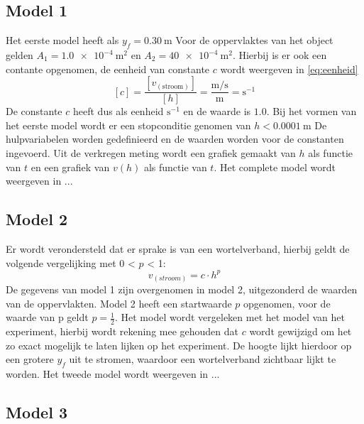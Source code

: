 \documentclass[numbers=endperiod]{scrartcl}
\begin{document}
\subsection{Model 1}
Het eerste model heeft als $y_f=\SI{0.30}{\meter}$ Voor de oppervlaktes van het object gelden $A_1=\SI{1.0e-4}{\meter\squared}$ en $A_2=\SI{40e-4}{\meter\squared}$. Hierbij is er ook een contante opgenomen, de eenheid van constante $c$ wordt weergeven in \ref{eq:eenheid}
\begin{equation}\label{eq:eenheid}
[c] = \frac{[v_{(\text{stroom})}]}{[h]} = \frac{\si{\meter\per\second}}{\si{\meter}} = \si{\second}^{-1}
\end{equation}
De constante $c$ heeft dus als eenheid $\si{\second}^{-1}$ en de waarde is $1.0$.
Bij het vormen van het eerste model wordt er een stopconditie genomen van $h<\SI{0.0001}{\meter}$ De hulpvariabelen worden gedefinieerd en de waarden worden voor de constanten ingevoerd. Uit de verkregen meting wordt een grafiek gemaakt van $h$ als functie van $t$ en een grafiek van $v(h)$ als functie van $t$. Het complete model wordt weergeven in ... 

\newpage
\subsection{Model 2}
Er wordt verondersteld dat er sprake is van een wortelverband, hierbij geldt de volgende vergelijking met 0 < $p$ < 1:
\begin{equation}
    v_{(stroom)} = c \cdot h^p
\end{equation}
De gegevens van model 1 zijn overgenomen in model 2, uitgezonderd de waarden van de oppervlakten. Model 2 heeft een startwaarde $p$ opgenomen, voor de waarde van p geldt $p=\frac{1}{2}$. Het model wordt vergeleken met het model van het experiment, hierbij wordt rekening mee gehouden dat $c$ wordt gewijzigd om het zo exact mogelijk te laten  lijken op het experiment. De hoogte lijkt hierdoor op een grotere $y_f$ uit te stromen, waardoor een wortelverband zichtbaar lijkt te worden. Het tweede model wordt weergeven in ...


\subsection{Model 3}
\end{document}
